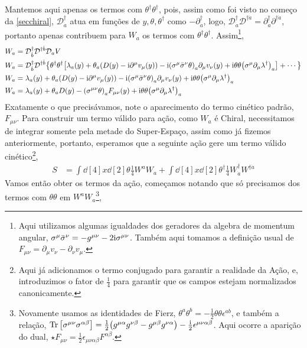 Mantemos aqui apenas os termos com $\theta^\dagger\theta^\dagger$, pois, assim como foi visto no começo da \cref{secchiral}, $\mathcal D^\dagger_{\dot a}$ atua em funções de $y,\theta,\theta^\dagger$ como $-\partial^\dagger_{\dot a}$, 
logo, $\mathcal D^\dagger_{\dot a}\mathcal D^{\dagger\dot a}=\partial^\dagger_{\dot a}\partial^{\dagger\dot a}$, portanto apenas contribuem para $W_a$ os termos com $\theta^\dagger\theta^\dagger$. Assim\footnote{Aqui utilizamos algumas igualdades dos 
geradores da algebra de momentum angular, $\sigma^\mu{\bar\sigma}^\nu=-g^{\mu\nu}-2\textnormal{i}\sigma^{\mu\nu}$. Também aqui tomamos a definição usual de $F_{\mu\nu}=\partial_\mu v_\nu-\partial_\nu v_\mu$.},
\begin{align*}
    W_a&=\mathcal D^\dagger_{\dot b}\mathcal D^{\dagger \dot b}\mathcal D_a V\\
    W_a&=\mathcal D^\dagger_{\dot b}\mathcal D^{\dagger \dot b}\qty{\theta^\dagger\theta^\dagger\qty[\lambda_a\qty(y)+\theta_a\qty(D\qty(y)-\textnormal{i}\partial^\mu v_\mu\qty(y))-\textnormal{i}\qty(\sigma^\mu{\bar\sigma^\nu}\theta)_a\partial_\mu v_\nu\qty(y)+\textnormal{i}\theta\theta\qty(\sigma^\mu\partial_\mu\lambda^\dagger)_a]+\cdots}\\
    W_a&=\lambda_a\qty(y)+\theta_a\qty(D\qty(y)-\textnormal{i}\partial^\mu v_\mu\qty(y))-\textnormal{i}\qty(\sigma^\mu{\bar\sigma^\nu}\theta)_a\partial_\mu v_\nu\qty(y)+\textnormal{i}\theta\theta\qty(\sigma^\mu\partial_\mu\lambda^\dagger)_a\\
    W_a&=\lambda_a\qty(y)+\theta_aD\qty(y)-\qty(\sigma^{\mu\nu}\theta)_aF_{\mu\nu}\qty(y)+\textnormal{i}\theta\theta\qty(\sigma^\mu\partial_\mu\lambda^\dagger)_a
\end{align*}
Exatamente o que precisávamos, note o aparecimento do termo cinético padrão, $F_{\mu\nu}$. Para construir um termo válido para ação, como $W_a$ é Chiral, necessitamos de 
integrar somente pela metade do Super-Espaço, assim como já fizemos anteriormente, portanto, esperamos que a seguinte ação gere um termo 
válido cinético\footnote{Aqui já adicionamos o termo conjugado para garantir a realidade da Ação, e, introduzimos o fator de $\frac14$ para garantir que os campos estejam normalizados canonicamente.},
\begin{align*}
    S&=\int\dd[4]{x}\dd[2]{\theta}\frac14W^aW_a+\int\dd[4]{x}\dd[2]{\theta^\dagger}\frac14W^\dagger_{\dot a}W^{\dagger\dot a}
\end{align*}
Vamos então obter os termos da ação, começamos notando que só precisamos dos termos com $\theta\theta$ em $W^aW_a$\footnote{Novamente usamos as identidades de Fierz, $\theta^a\theta^b=-\frac12\theta\theta\epsilon^{ab}$, e também a relação, $\Tr\qty[\sigma^{\mu\nu}\sigma^{\alpha\beta}]=\frac12\qty(g^{\mu\alpha}g^{\nu\beta}-g^{\mu\beta}g^{\nu\alpha})-\frac{\textnormal{i}}2\epsilon^{\mu\nu\alpha\beta}$. Aqui ocorre a aparição do 
dual, $\star F_{\mu\nu}=\frac12\epsilon_{\mu\nu\alpha\beta}F^{\alpha\beta}$.},
